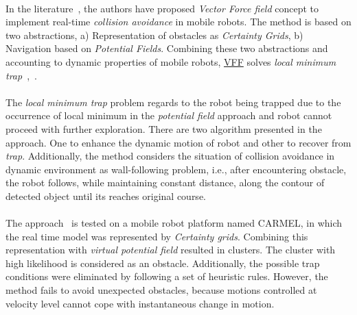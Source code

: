 \paragraph{}In the literature~\cite{borenstein1989real}, the authors have proposed \textit{Vector Force field} concept to implement real-time \textit{collision avoidance} in mobile robots. The method is based on two abstractions, a) Representation of obstacles as \textit{Certainty Grids}, b) Navigation based on \textit{Potential Fields}. Combining these two abstractions and accounting to dynamic properties of mobile robots, \hyperref[vff]{VFF} solves \textit{local minimum trap}~\cite{julia2008local},~\cite{park2003new}. 

\paragraph{}The \textit{local minimum trap} problem regards to the robot being trapped due to the occurrence of local minimum in the \textit{potential field} approach and robot cannot proceed with further exploration. There are two algorithm presented in the approach. One to enhance the dynamic motion of robot and other to recover from \textit{trap}. Additionally, the method considers the situation of collision avoidance in dynamic environment as wall-following problem, i.e., after encountering obstacle, the robot follows, while maintaining constant distance, along the contour of detected object until its reaches original course. 

\paragraph{}The approach~\cite{borenstein1989real} is tested on a mobile robot platform named CARMEL, in which the real time model was represented by \textit{Certainty grids}. Combining this representation with \textit{virtual potential field} resulted in clusters. The cluster with high likelihood is considered as an obstacle. Additionally, the possible trap conditions were eliminated by following a set of heuristic rules. However, {\color{red}the method fails to avoid unexpected obstacles, because motions controlled at velocity level cannot cope with instantaneous change in motion.}



